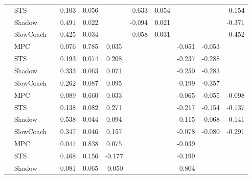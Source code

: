 \begin{tabular}{|l|l|*{9}{c|}}
                                                           & STS &       &     0.103 &     0.056 &     & -0.633 &  0.054 &      &      &   -0.154 \\
                                                           & Shadow &       &     0.491 &     0.022 &     & -0.094 &  0.021 &      &      &   -0.371 \\
                                                           & SlowCoach &       &     0.425 &     0.034 &     & -0.058 &  0.031 &      &      &   -0.452 \\
\midrule
[False, True, True, True, False, False, True, True, False] & MPC &       &     0.076 &     0.785 &  0.035 &     &     &  -0.051 &  -0.053 &       \\
                                                           & STS &       &     0.193 &     0.074 &  0.208 &     &     &  -0.237 &  -0.288 &       \\
                                                           & Shadow &       &     0.333 &     0.063 &  0.071 &     &     &  -0.250 &  -0.283 &       \\
                                                           & SlowCoach &       &     0.262 &     0.087 &  0.095 &     &     &  -0.199 &  -0.357 &       \\
\midrule
[False, True, True, True, False, False, True, True, True] & MPC &       &     0.089 &     0.660 &  0.033 &     &     &  -0.065 &  -0.055 &   -0.098 \\
                                                           & STS &       &     0.138 &     0.082 &  0.271 &     &     &  -0.217 &  -0.154 &   -0.137 \\
                                                           & Shadow &       &     0.538 &     0.044 &  0.094 &     &     &  -0.115 &  -0.068 &   -0.141 \\
                                                           & SlowCoach &       &     0.347 &     0.046 &  0.157 &     &     &  -0.078 &  -0.080 &   -0.291 \\
\midrule
[False, True, True, True, False, False, True, False, False] & MPC &       &     0.047 &     0.838 &  0.075 &     &     &  -0.039 &      &       \\
                                                           & STS &       &     0.468 &     0.156 & -0.177 &     &     &  -0.199 &      &       \\
                                                           & Shadow &       &     0.081 &     0.065 & -0.050 &     &     &  -0.804 &      &       \\

\end{tabular}
